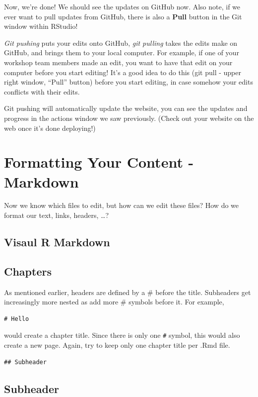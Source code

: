 \documentclass[
]{book}
\theoremstyle{definition}
\theoremstyle{definition}
\theoremstyle{definition}
\theoremstyle{definition}
\theoremstyle{remark}
\begin{document}
Now, we're done! We should see the updates on GitHub now. Also note, if we ever want to pull updates from GitHub, there is also a \textbf{Pull} button in the Git window within RStudio!

\emph{Git pushing} puts your edits onto GitHub, \emph{git pulling} takes the edits make on GitHub, and brings them to your local computer. For example, if one of your workshop team members made an edit, you want to have that edit on your computer before you start editing! It's a good idea to do this (git pull - upper right window, ``Pull'' button) before you start editing, in case somehow your edits conflicts with their edits.

Git pushing will automatically update the website, you can see the updates and progress in the actions window we saw previously. (Check out your website on the web once it's done deploying!)

\chapter{Formatting Your Content - Markdown}\label{formatting-your-content---markdown}

Now we know which files to edit, but how can we edit these files? How do we format our text, links, headers, \ldots?

\section{Visaul R Markdown}\label{visaul-r-markdown}

\section{Chapters}\label{chapters}

As mentioned earlier, headers are defined by a \# before the title. Subheaders get increasingly more nested as add more \# symbols before it. For example,

\begin{verbatim}
# Hello
\end{verbatim}

would create a chapter title. Since there is only one \texttt{\#} symbol, this would also create a new page. Again, try to keep only one chapter title per .Rmd file.

\begin{verbatim}
## Subheader
\end{verbatim}

\section{Subheader}\label{subheader}
\end{document}
